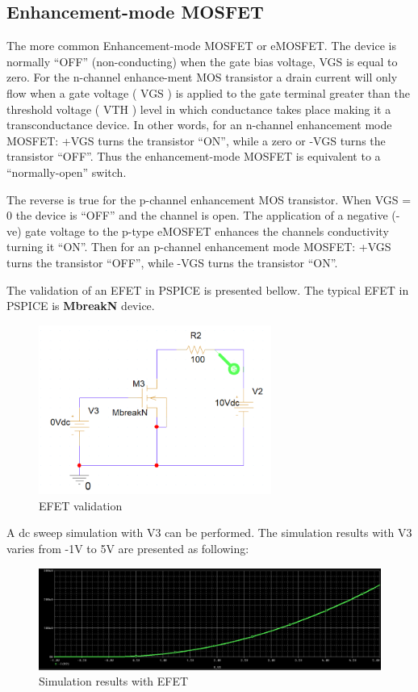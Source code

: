 \subsection{Enhancement-mode MOSFET}
The more common Enhancement-mode MOSFET or eMOSFET. The device is normally “OFF” (non-conducting) when the gate bias voltage, VGS is equal to zero. For the n-channel enhance-ment MOS transistor a drain current will only flow when a gate voltage ( VGS ) is applied to the gate terminal greater than the threshold voltage ( VTH ) level in which conductance takes place making it a transconductance device. In other words, for an n-channel enhancement mode MOSFET: +VGS turns the transistor “ON”, while a zero or -VGS turns the transistor “OFF”. Thus the enhancement-mode MOSFET is equivalent to a “normally-open” switch.

The reverse is true for the p-channel enhancement MOS transistor. When VGS = 0 the device is “OFF” and the channel is open. The application of a negative (-ve) gate voltage to the p-type eMOSFET enhances the channels conductivity turning it “ON”. Then for an p-channel enhancement mode MOSFET: +VGS turns the transistor “OFF”, while -VGS turns the transistor “ON”.

The validation of an EFET in PSPICE is presented bellow. The typical EFET in PSPICE is \textbf{MbreakN} device.
\begin{figure}[!htp]
    \centering
    \includegraphics[width = 3in]{graphics/ex2/f5.png}
    \caption{EFET validation}
\end{figure}

A dc sweep simulation with V3 can be performed. The simulation results with V3 varies from -1V to 5V are presented as following:
\begin{figure}[!htp]
    \centering
    \includegraphics[width = 4.5in]{graphics/ex2/f6.png}
    \caption{Simulation results with EFET}
\end{figure}